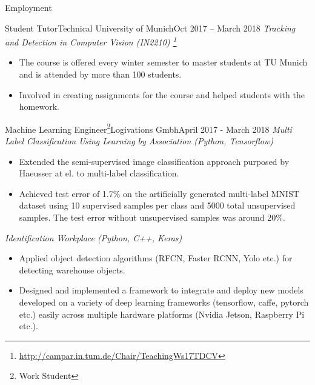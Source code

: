 \documentclass[]{mcdowellcv}
\begin{document}
    \begin{cvsection}{Employment}
    
            \begin{cvsubsection}{Student Tutor}{Technical University of Munich}{Oct 2017 -- March 2018}    
        \textit{Tracking and Detection in Computer Vision (IN2210) \footnote{\href{http://campar.in.tum.de/Chair/TeachingWs17TDCV}{http://campar.in.tum.de/Chair/TeachingWs17TDCV}}}
            \begin{itemize}
                \item The course is offered every winter semester to master students at TU Munich and is attended by more than 100 students. 
                \item Involved in creating assignments for the course and helped students with the homework. 
            \end{itemize}
        \end{cvsubsection}
    
        \begin{cvsubsection}{Machine Learning Engineer\footnote{Work Student\label{ws}}}{Logivations Gmbh}{April 2017 - March 2018}
            \textit{Multi Label Classification Using Learning by Association (Python, Tensorflow)}
            \begin{itemize}
                \item Extended the semi-supervised image classification approach purposed by Haeusser at el. \cite{haeusser-cvpr-17} to multi-label classification.
                \item Achieved test error of 1.7\% on the artificially generated multi-label MNIST dataset using 10 supervised samples per class and 5000 total unsupervised samples. The test error without unsupervised samples was around 20\%.
            \end{itemize}
            
            \textit{Identification Workplace (Python, C++, Keras)}
            \begin{itemize}
                \item Applied object detection algorithms (RFCN, Faster RCNN, Yolo etc.) for detecting warehouse objects.
                \item Designed and implemented a framework to integrate and deploy new models developed on a variety of deep learning frameworks (tensorflow, caffe, pytorch etc.) easily across multiple hardware platforms (Nvidia Jetson, Raspberry Pi etc.).
            \end{itemize}
            

\end{cvsubsection}
\end{cvsection}
\end{document}
